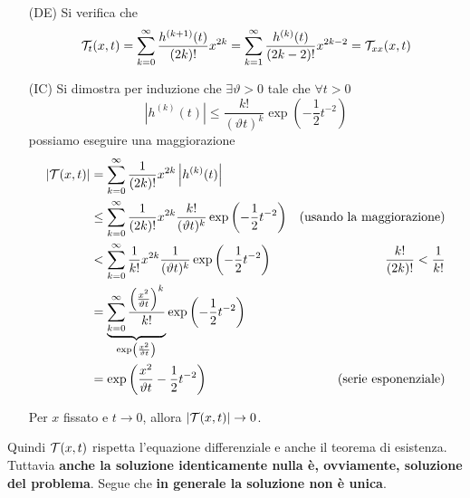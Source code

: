 \documentclass[10pt,a4paper,twoside,openright]{book}
\begin{document}
\begin{dimostrazione}
	\ \\
	\begin{enumerate}
	\item[(DE)] Si verifica che\begin{equation*}
	\mathcal{T} _{t}( x,t) =\sum\limits _{k=0}^{\infty }\frac{h^{( k+1)}( t)}{( 2k) !} x^{2k} =\sum\limits _{k=1}^{\infty }\frac{h^{( k)}( t)}{( 2k-2) !} x^{2k-2} =\mathcal{T} _{xx}( x,t)
	\end{equation*}
	\item[(IC)] Si dimostra per induzione che $\exists \vartheta  >0$ tale che $\forall t >0$\begin{equation*}
	\left| h^{( k)}( t)\right| \leqslant \frac{k!}{( \vartheta t)^{k}}\exp\left( -\frac{1}{2} t^{-2}\right)
	\end{equation*}possiamo eseguire una maggiorazione\begin{align*}
	| \mathcal{T} ( x,t)|  & =\sum\limits _{k=0}^{\infty }\frac{1}{( 2k) !} x^{2k}\left| h^{( k)}( t)\right|  & \\
	 & \leq \sum\limits _{k=0}^{\infty }\frac{1}{( 2k) !} x^{2k}\frac{k!}{( \vartheta t)^{k}}\exp\left( -\frac{1}{2} t^{-2}\right) & \text{(usando la maggiorazione)}\\
	 & < \sum\limits _{k=0}^{\infty }\frac{1}{k!} x^{2k}\frac{1}{( \vartheta t)^{k}}\exp\left( -\frac{1}{2} t^{-2}\right) & \frac{k!}{( 2k) !} < \frac{1}{k!}\\
	 & =\underbrace{\sum\limits _{k=0}^{\infty }\frac{\left(\frac{x^{2}}{\vartheta t}\right)^{k}}{k!}}_{\exp\left(\frac{x^{2}}{\vartheta t}\right)}\exp\left( -\frac{1}{2} t^{-2}\right) & \\
	 & =\exp\left(\frac{x^{2}}{\vartheta t} -\frac{1}{2} t^{-2}\right) & \text{(serie esponenziale)}
	\end{align*}

	Per $x$ fissato e $t\rightarrow 0$, allora $| \mathcal{T} ( x,t)| \rightarrow 0$.
	\end{enumerate}
\end{dimostrazione}
Quindi $\mathcal{T} ( x,t)$ rispetta l'equazione differenziale e anche il teorema di esistenza. Tuttavia \textbf{anche la soluzione identicamente nulla è, ovviamente, soluzione del problema}. Segue che \textbf{in generale la soluzione non è unica}.
\end{document}
